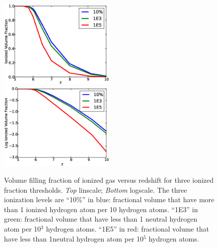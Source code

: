 
\begin{figure}
	\includegraphics[width=0.5\textwidth]{Ionized_vs_Redshift.eps}
	\includegraphics[width=0.5\textwidth]{Log_Ionized_vs_Redshift.eps}
	\caption{Volume filling fraction of ionized gas versus redshift for three ionized fraction thresholds. {\em Top} linscale; {\em Bottom} logscale. The three ionization levels are ``10\%'' in blue: fractional volume that have more than 1 ionized hydrogen atom per 10 hydrogen atoms.  ``1E3'' in green: fractional volume that have less than 1 neutral hydrogen atom per 10$^3$ hydrogen atoms.  ``1E5'' in red:  fractional volume that have less than 1neutral hydrogen atom per 10$^5$ hydrogen atoms.}
	\label{linearIonized}
\end{figure}



